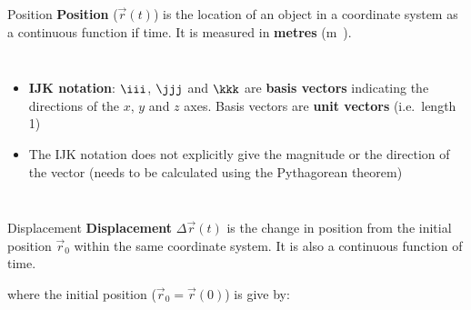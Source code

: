 \documentclass[12pt,compress,aspectratio=169,dvipsnames]{beamer}
\begin{document}
\begin{frame}{Position}
  \textbf{Position} ($\vec r(t)$) is the location of an object in a coordinate
  system as a continuous function if time. It is measured in \textbf{metres}
  (\si\metre).
  \begin{columns}

    \begin{itemize}
    \item\vspace{-.1in}\textbf{IJK notation}: $\iii$, $\jjj$ and $\kkk$ are
      \textbf{basis vectors} indicating the directions of the $x$, $y$ and $z$
      axes. Basis vectors are \textbf{unit vectors} (i.e.\ length 1)
    \item The IJK notation does not explicitly give the magnitude or the
      direction of the vector (needs to be calculated using the Pythagorean
      theorem)
    \end{itemize}

  \end{columns}
\end{frame}



\begin{frame}{Displacement}
  \textbf{Displacement} $\Delta\vec r(t)$ is the change in position from the
  initial position $\vec r_0$ within the same coordinate system. It is also a
  continuous function of time.


  where the initial position ($\vec r_0=\vec r(0)$) is give by:

  
\end{frame}
\end{document}
